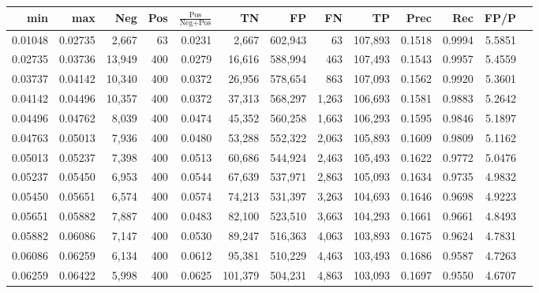 \begin{tabular}{rrrrrrrrrrrrr}
\toprule
    min &     max &    Neg & Pos & $\frac{\text{Pos}}{\text{Neg}+\text{Pos}}$ &      TN &      FP &      FN &      TP &   Prec &    Rec &   FP/P \\
\midrule
0.01048 & 0.02735 &  2,667 &  63 &                                     0.0231 &   2,667 & 602,943 &      63 & 107,893 & 0.1518 & 0.9994 & 5.5851 \\
0.02735 & 0.03736 & 13,949 & 400 &                                     0.0279 &  16,616 & 588,994 &     463 & 107,493 & 0.1543 & 0.9957 & 5.4559 \\
0.03737 & 0.04142 & 10,340 & 400 &                                     0.0372 &  26,956 & 578,654 &     863 & 107,093 & 0.1562 & 0.9920 & 5.3601 \\
0.04142 & 0.04496 & 10,357 & 400 &                                     0.0372 &  37,313 & 568,297 &   1,263 & 106,693 & 0.1581 & 0.9883 & 5.2642 \\
0.04496 & 0.04762 &  8,039 & 400 &                                     0.0474 &  45,352 & 560,258 &   1,663 & 106,293 & 0.1595 & 0.9846 & 5.1897 \\
0.04763 & 0.05013 &  7,936 & 400 &                                     0.0480 &  53,288 & 552,322 &   2,063 & 105,893 & 0.1609 & 0.9809 & 5.1162 \\
0.05013 & 0.05237 &  7,398 & 400 &                                     0.0513 &  60,686 & 544,924 &   2,463 & 105,493 & 0.1622 & 0.9772 & 5.0476 \\
0.05237 & 0.05450 &  6,953 & 400 &                                     0.0544 &  67,639 & 537,971 &   2,863 & 105,093 & 0.1634 & 0.9735 & 4.9832 \\
0.05450 & 0.05651 &  6,574 & 400 &                                     0.0574 &  74,213 & 531,397 &   3,263 & 104,693 & 0.1646 & 0.9698 & 4.9223 \\
0.05651 & 0.05882 &  7,887 & 400 &                                     0.0483 &  82,100 & 523,510 &   3,663 & 104,293 & 0.1661 & 0.9661 & 4.8493 \\
0.05882 & 0.06086 &  7,147 & 400 &                                     0.0530 &  89,247 & 516,363 &   4,063 & 103,893 & 0.1675 & 0.9624 & 4.7831 \\
0.06086 & 0.06259 &  6,134 & 400 &                                     0.0612 &  95,381 & 510,229 &   4,463 & 103,493 & 0.1686 & 0.9587 & 4.7263 \\
0.06259 & 0.06422 &  5,998 & 400 &                                     0.0625 & 101,379 & 504,231 &   4,863 & 103,093 & 0.1697 & 0.9550 & 4.6707 \\

\end{tabular}
